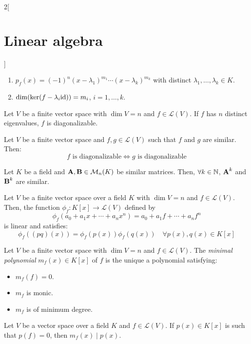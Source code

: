 \documentclass[../../../main.tex]{subfiles}
\begin{document}
\begin{multicols}{2}[\section{Linear algebra}]
\begin{theorem}
\begin{enumerate}
      \item $p_f(x)=(-1)^n(x-\lambda_1)^{m_1}\cdots(x-\lambda_k)^{m_k}$ with distinct $\lambda_1,\ldots,\lambda_k\in K$.
      \item $\dim(\ker(f-\lambda_i \mathrm{id}))=m_i$, $i=1,\ldots,k$.
    \end{enumerate}
  \end{theorem}
  \begin{corollary}
    Let $V$ be a finite vector space with $\dim V=n$ and $f\in\mathcal{L}(V)$. If $f$ has $n$ distinct eigenvalues, $f$ is diagonalizable.
  \end{corollary}
  \begin{prop}
    Let $V$ be a finite vector space and $f,g\in\mathcal{L}(V)$ such that $f$ and $g$ are similar. Then: $$f\text{ is diagonalizable}\iff g\text{ is diagonalizable}$$
  \end{prop}
  \begin{lemma}
    Let $K$ be a field and $\boldsymbol{\mathrm{A}},\boldsymbol{\mathrm{B}}\in\mathcal{M}_n(K)$ be similar matrices. Then, $\forall k\in\mathbb{N}$, $\boldsymbol{\mathrm{A}}^k$ and $\boldsymbol{\mathrm{B}}^k$ are similar.
  \end{lemma}
  \begin{lemma}
    Let $V$ be a finite vector space over a field $K$ with $\dim V=n$ and $f\in\mathcal{L}(V)$. Then, the function $\phi_f:K[x]\rightarrow\mathcal{L}(V)$ defined by $$\phi_f(a_0+a_1x+\cdots+a_nx^n)=a_0+a_1f+\cdots+a_nf^n$$
    is linear and satisfies: $$\phi_f((pq)(x))=\phi_f(p(x))\phi_f(q(x))\quad\forall p(x),q(x)\in K[x]$$
  \end{lemma}
  \begin{definition}
    Let $V$ be a finite vector space with $\dim V=n$ and $f\in\mathcal{L}(V)$. The \emph{minimal polynomial} $m_f(x)\in K[x]$ of $f$ is the unique a polynomial satisfying:
    \begin{itemize}
      \item $m_f(f)=0$.
      \item $m_f$ is monic.
      \item $m_f$ is of minimum degree.
    \end{itemize}
  \end{definition}
  \begin{prop}
    Let $V$ be a vector space over a field $K$ and $f\in\mathcal{L}(V)$. If $p(x)\in K[x]$ is such that $p(f)=0$, then $m_f(x)\mid p(x)$.
  \end{prop}

\end{multicols}
\end{document}
